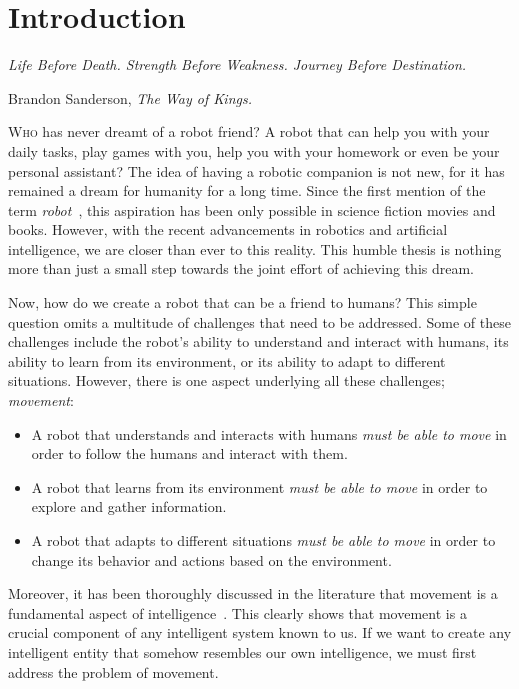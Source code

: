 \chapter{Introduction}\label{ch:introduction}

\setlength{}
\epigraph{\itshape Life Before Death. Strength Before Weakness. Journey Before Destination.}{Brandon Sanderson, \textit{The Way of Kings.}}

\lettrine{\textcolor{accent_color}{W}}{ho} has never dreamt of a robot friend?
A robot that can help you with your daily tasks, play games with you, help you with your homework or even be your personal assistant?
The idea of having a robotic companion is not new, for it has remained a dream for humanity for a long time.
Since the first mention of the term \textit{robot}~\cite{robot1920}, this aspiration has been only possible in science fiction movies and books.
However, with the recent advancements in robotics and artificial intelligence, we are closer than ever to this reality.
This humble thesis is nothing more than just a small step towards the joint effort of achieving this dream.

Now, how do we create a robot that can be a friend to humans?
This simple question omits a multitude of challenges that need to be addressed.
Some of these challenges include the robot's ability to understand and interact with humans, its ability to learn from its environment, or its ability to adapt to different situations.
However, there is one aspect underlying all these challenges; \textit{movement}:

\begin{itemize}
    \item A robot that understands and interacts with humans \textit{must be able to move} in order to follow the humans and interact with them.
    \item A robot that learns from its environment \textit{must be able to move} in order to explore and gather information.
    \item A robot that adapts to different situations \textit{must be able to move} in order to change its behavior and actions based on the environment.
\end{itemize}

Moreover, it has been thoroughly discussed in the literature that movement is a fundamental aspect of intelligence~\cite{Darwin1871, Arbib2005, Leisman2016, Wolpert2011, Llinas2001}.
This clearly shows that movement is a crucial component of any intelligent system known to us.
If we want to create any intelligent entity that somehow resembles our own intelligence, we must first address the problem of movement.

